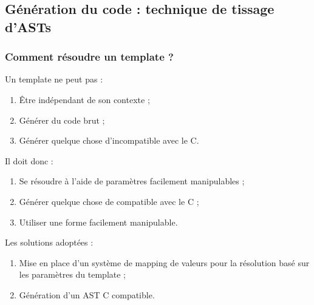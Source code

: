\documentclass[]{beamer}
\begin{document}
\subsection{Génération du code : technique de tissage d'ASTs}
\begin{frame}
\frametitle{Comment résoudre un template ?}
 {
    Un template ne peut pas :
    \begin{enumerate}[<+->]
        \item Être indépendant de son contexte ;
        \item Générer du code brut ;
        \item Générer quelque chose d'incompatible avec le C.
    \end{enumerate}
     {
        Il doit donc :
        \begin{enumerate}[<+->]
            \item Se résoudre à l'aide de paramètres facilement manipulables ;
            \item Générer quelque chose de compatible avec le C ;
            \item Utiliser une forme facilement manipulable.
        \end{enumerate}
    }
}
 {
    Les solutions adoptées :
    \begin{enumerate}
        \item Mise en place d'un système de mapping de valeurs pour
            la résolution basé sur les paramètres du template ;
        \item Génération d'un AST C compatible.
    \end{enumerate}
}
\end{frame}
\end{document}
